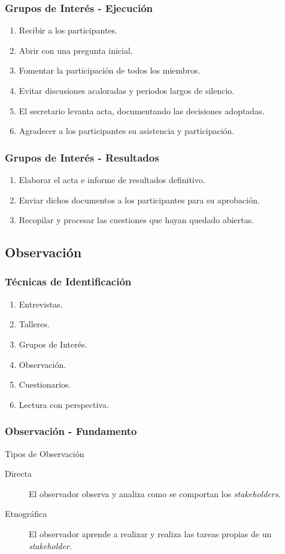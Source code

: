 ﻿\documentclass[handout,a4paper,slidestop,xcolor=pst,dvips,blue]{beamer}
\begin{document}
\begin{frame}[t]
    \frametitle{Grupos de Interés - Ejecución}
    \begin{enumerate}[<+->]
        \item Recibir a los participantes.
        \item Abrir con una pregunta inicial.
        \item Fomentar la participación de todos los miembros.
        \item Evitar discusiones acaloradas y periodos largos de silencio.
        \item El secretario levanta acta, documentando las decisiones adoptadas.
        \item Agradecer a los participantes su asistencia y participación.
    \end{enumerate}
\end{frame}

\begin{frame}[t]
    \frametitle{Grupos de Interés - Resultados}
    \begin{enumerate}[<+->]
        \item Elaborar el acta e informe de resultados definitivo.
        \item Enviar dichos documentos a los participantes para su aprobación.
        \item Recopilar y procesar las cuestiones que hayan quedado abiertas.
    \end{enumerate}
\end{frame}

\subsection{Observación}

\begin{frame}[c]
    \frametitle{Técnicas de Identificación}
    \begin{enumerate}
         \item Entrevistas.
         \item Talleres.
         \item Grupos de Interés.
         \item \alert{Observación}.
         \item Cuestionarios.
         \item Lectura con perspectiva.
    \end{enumerate}
\end{frame}

\begin{frame}[t]
    \frametitle{Observación - Fundamento}
    \begin{block}{Tipos de Observación}
        \begin{description}
            \item[Directa] El observador observa y analiza como se comportan los \emph{stakeholders}.
            \item[Etnográfica] El observador aprende a realizar y realiza las tareas propias de un \emph{stakeholder}.
        \end{description}
    \end{block}
\end{frame}
\end{document}
